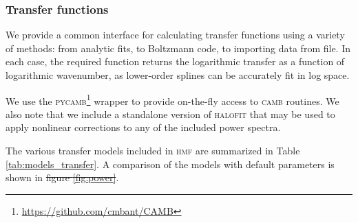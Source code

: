 \documentclass[5p,aas_macros]{elsarticle}
\newcommand{\bd}[1]{\textcolor{purple}{\textbf{[BD: #1]}}}
\providecommand{\DIFaddtex}[1]{{\protect\color{blue}\uwave{#1}}} %
\providecommand{\DIFdeltex}[1]{{\protect\color{red}\sout{#1}}}                      %
\providecommand{\DIFaddbegin}{} %
\providecommand{\DIFaddend}{} %
\providecommand{\DIFdelbegin}{} %
\providecommand{\DIFdelend}{} %
\providecommand{\DIFadd}[1]{\texorpdfstring{\DIFaddtex{#1}}{#1}} %
\providecommand{\DIFdel}[1]{\texorpdfstring{\DIFdeltex{#1}}{}} %
\begin{document}
\subsubsection{Transfer functions}
\label{sec:halomod:components:transfer}
We provide a common interface for calculating transfer functions using a variety of methods: from analytic fits, to Boltzmann code, to importing data from file. In each case, the required function returns the logarithmic transfer as a function of logarithmic wavenumber, as lower-order splines can be accurately fit in log space. 

We use the \textsc{pycamb}\footnote{\url{https://github.com/cmbant/CAMB}} wrapper to provide on-the-fly access to \textsc{camb} routines. We also note that we include a standalone version of \textsc{halofit} that may be used to apply nonlinear corrections to any of the included power spectra.

The various transfer models included in \textsc{hmf} are summarized in Table \ref{tab:models_transfer}. A comparison of the models with default parameters is shown in \DIFdelbegin \DIFdel{figure \ref{fig:power}}\DIFdelend \DIFaddbegin \DIFadd{\mbox{%
\cref{fig:power}}\hspace{0pt}%
}\DIFaddend .




\end{document}
